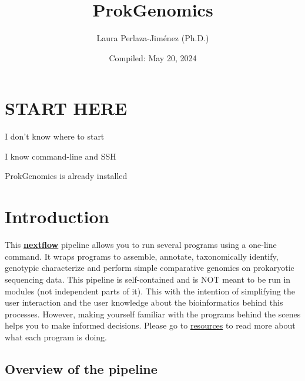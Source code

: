 \documentclass[
]{book}
\title{ProkGenomics}
\author{Laura Perlaza-Jiménez (Ph.D.)}
\date{Compiled: May 20, 2024}
\begin{document}
\maketitle

{
\setcounter{tocdepth}{1}
\tableofcontents
}
\hypertarget{start-here}{%
\chapter{START HERE}\label{start-here}}

{I don't know where to start}

{I know command-line and SSH}

{ProkGenomics is already installed }

\hypertarget{introduction}{%
\chapter{Introduction}\label{introduction}}

This \textbf{\href{https://www.nextflow.io/}{nextflow}} pipeline allows you to run several programs using a one-line command. It wraps programs to assemble, annotate, taxonomically identify, genotypic characterize and perform simple comparative genomics on prokaryotic sequencing data. This pipeline is self-contained and is NOT meant to be run in modules (not independent parts of it). This with the intention of simplifying the user interaction and the user knowledge about the bioinformatics behind this processes. However, making yourself familiar with the programs behind the scenes helps you to make informed decisions. Please go to \href{resources.html}{resources} to read more about what each program is doing.

\hypertarget{overview-of-the-pipeline}{%
\section{Overview of the pipeline}\label{overview-of-the-pipeline}}
\end{document}
